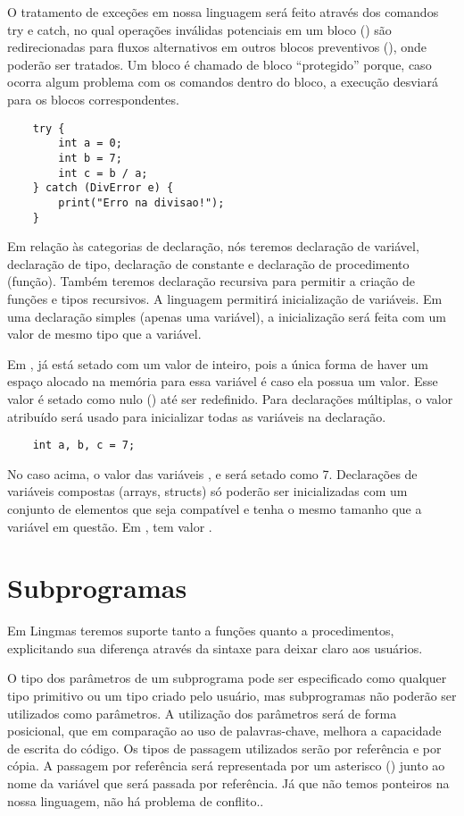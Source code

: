 O tratamento de exceções em nossa linguagem será feito através dos comandos try
e catch, no qual operações inválidas potenciais em um bloco () são
redirecionadas para fluxos alternativos em outros blocos preventivos
(), onde poderão ser tratados. Um bloco  é chamado de bloco
“protegido” porque, caso ocorra algum problema com os comandos dentro do bloco,
a execução desviará para os blocos  correspondentes.

\begin{lstlisting}
    try {
        int a = 0;
        int b = 7;
        int c = b / a;
    } catch (DivError e) {
        print("Erro na divisao!");
    }
\end{lstlisting}

Em relação às categorias de declaração, nós teremos declaração de variável,
declaração de tipo, declaração de constante e declaração de procedimento
(função). Também teremos declaração recursiva para permitir a criação de
funções e tipos recursivos. A linguagem permitirá inicialização de variáveis.
Em uma declaração simples (apenas uma variável), a inicialização será feita com
um valor de mesmo tipo que a variável.

Em ,  já está setado com um valor de inteiro, pois a única forma
de haver um espaço alocado na memória para essa variável é caso ela possua um
valor. Esse valor é setado como nulo () até ser redefinido.  Para
declarações múltiplas, o valor atribuído será usado para inicializar todas as
variáveis na declaração.

\begin{lstlisting}
    int a, b, c = 7;
\end{lstlisting}

No caso acima, o valor das variáveis ,  e  será setado como
7.  Declarações de variáveis compostas (arrays, structs) só poderão ser
inicializadas com um conjunto de elementos que seja compatível e tenha o mesmo
tamanho que a variável em questão.  Em ,  tem valor
.

\section{Subprogramas}
Em Lingmas teremos suporte tanto a funções quanto a procedimentos, explicitando
sua diferença através da sintaxe para deixar claro aos usuários.

O tipo dos parâmetros de um subprograma pode ser especificado como qualquer
tipo primitivo ou um tipo criado pelo usuário, mas subprogramas não poderão ser
utilizados como parâmetros. A utilização dos parâmetros será de forma
posicional, que em comparação ao uso de palavras-chave, melhora a capacidade de
escrita do código. Os tipos de passagem utilizados serão por referência e por
cópia. A passagem por referência será representada por um asterisco (\ic{*})
junto ao nome da variável que será passada por referência. Já que não temos
ponteiros na nossa linguagem, não há problema de conflito..


